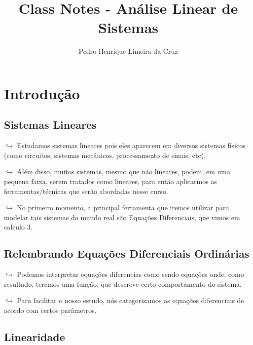 \documentclass[]{article}
\author{Pedro Henrique Limeira da Cruz}
\title{Class Notes - Análise Linear de Sistemas}
\begin{document}
  \maketitle
  \thispagestyle{empty}
  \newpage

  \tableofcontents
  \newpage



  \section{Introdução}


    \subsection{Sistemas Lineares}\label{sistemas-lineares}

    \(\hookrightarrow\) Estudamos sistemas lineares pois eles aparecem em
    diversos sistemas físicos (como circuitos, sistemas mecânicos,
    processamento de sinais, etc).

    \(\hookrightarrow\) Além disso, muitos sistemas, mesmo que não lineares,
    podem, em uma pequena faixa, serem tratados como lineares, para então
    aplicarmos as ferramentas/técnicas que serão abordadas nesse curso.

    \(\hookrightarrow\) No primeiro momento, a principal ferramenta que
    iremos utilizar para modelar tais sistemas do mundo real são Equações
    Diferenciais, que vimos em calculo 3.

    

    \subsection{Relembrando Equações Diferenciais
    Ordinárias}\label{relembrando-equauxe7uxf5es-diferenciais-ordinuxe1rias}

    \(\hookrightarrow\) Podemos interpretar equações diferencias como sendo
    equações onde, como resultado, teremos uma função, que descreve certo
    comportamento do sistema.

    \(\hookrightarrow\) Para facilitar o nosso estudo, nós categorizamos as
    equações diferenciais de acordo com certos parâmetros.

    \hypertarget{linearidade}{%
    \subsection{Linearidade}\label{linearidade}}
\end{document}
